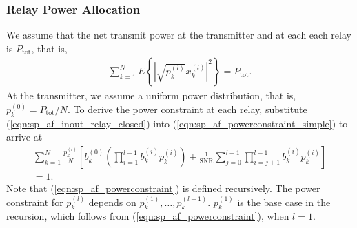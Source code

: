 \documentclass[journal]{IEEEtran}
\begin{document}
\subsubsection{Relay Power Allocation}
We assume that the net transmit power at the transmitter and at
each each relay is $P_{\mbox{tot}}$, that is,
\begin{eqnarray}
\sum_{k=1}^N E \left\{ \left| \sqrt{p_k^{(l)}} x_k^{(l)} \right| ^2 \right\} = P_{\mbox{tot}}.
\label{eqn:sp_af_powerconstraint_simple}
\end{eqnarray}
At the transmitter, we assume a uniform power distribution, that is, $p_k^{(0)} = P_{\mbox{tot}}/N$.  To derive the power constraint at each relay, substitute (\ref{eqn:sp_af_inout_relay_closed}) into (\ref{eqn:sp_af_powerconstraint_simple}) to arrive at
\begin{eqnarray}
\sum_{k=1}^N \frac{ p_k^{(l)}}{N} \left[
b_k^{(0)} \left( \prod_{i=1}^{l-1}  b_k^{(i)}p_k^{(i)} \right) +
\frac{1}{\mbox{SNR}} \sum_{j=0}^{l-1} \prod_{i=j+1}^{l-1}  b_k^{(i)}p_k^{(i)} \right] \nonumber \\
=1. \label{eqn:sp_af_powerconstraint}
\end{eqnarray}
Note that (\ref{eqn:sp_af_powerconstraint}) is defined
recursively.  The power constraint for $p_k^{(l)}$ depends on
$p_k^{(1)}, \dots, p_k^{(l-1)}$.  $p_k^{(1)}$ is the base case in
the recursion, which follows from
(\ref{eqn:sp_af_powerconstraint}), when $l = 1$.
\end{document}
